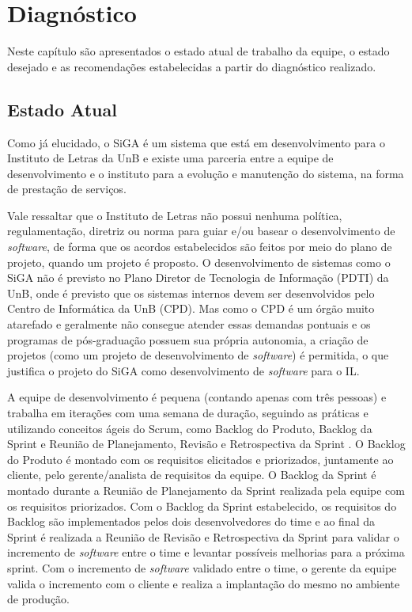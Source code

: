 \chapter{Diagnóstico} \label{cap:diagnostico}

Neste capítulo são apresentados o estado atual de trabalho da equipe, o estado desejado e as recomendações estabelecidas
a partir do diagnóstico realizado.

\section{Estado Atual}

Como já elucidado, o SiGA é um sistema que está em desenvolvimento para o Instituto de Letras da UnB
e existe uma parceria entre a equipe de desenvolvimento e o instituto para a evolução e manutenção do sistema,
na forma de prestação de serviços.

Vale ressaltar que o Instituto de Letras não possui nenhuma política, regulamentação, diretriz ou norma para guiar e/ou basear
o desenvolvimento de \textit{software}, de forma que os acordos estabelecidos são feitos por meio do plano de projeto, quando um projeto
é proposto. O desenvolvimento de sistemas como o SiGA não é previsto no Plano Diretor de Tecnologia de Informação (PDTI) da UnB, onde 
é previsto que os sistemas internos devem ser desenvolvidos pelo Centro de Informática da UnB (CPD). Mas como o CPD é um órgão muito
atarefado e geralmente não consegue atender essas demandas pontuais e os programas de pós-graduação possuem sua própria autonomia, a criação
de projetos (como um projeto de desenvolvimento de \textit{software}) é permitida, o que justifica o projeto do SiGA como desenvolvimento 
de \textit{software} para o IL.

A equipe de desenvolvimento é pequena (contando apenas com três pessoas) e trabalha em iterações com uma semana de duração,
seguindo as práticas e utilizando conceitos ágeis do Scrum, como Backlog do Produto, Backlog da Sprint e
Reunião de Planejamento, Revisão e Retrospectiva da Sprint \cite{scrum}.
O Backlog do Produto é montado com os requisitos elicitados e priorizados, juntamente ao cliente,
pelo gerente/analista de requisitos da equipe.
O Backlog da Sprint é montado durante a Reunião de Planejamento da Sprint realizada pela equipe com os requisitos
priorizados. Com o Backlog da Sprint estabelecido, os requisitos do Backlog são implementados pelos dois desenvolvedores do time
e ao final da Sprint é realizada a Reunião de Revisão e Retrospectiva da Sprint para validar o incremento de \textit{software} entre 
o time e levantar possíveis melhorias para a próxima sprint. Com o incremento de \textit{software} validado entre o time, o gerente
da equipe valida o incremento com o cliente e realiza a implantação do mesmo no ambiente de produção.

